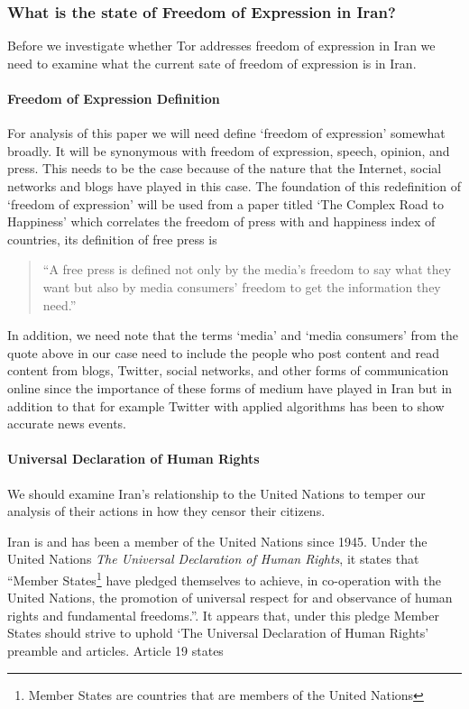 \documentclass[11pt]{article}
\begin{document}
\begin{multicols}{2}
\subsubsection{What is the state of Freedom of Expression in Iran?}
Before we investigate whether Tor addresses freedom of expression in Iran we need
to examine what the current sate of freedom of expression is in Iran. 

\paragraph{Freedom of Expression Definition}

For analysis of this paper we will need define `freedom of expression' somewhat
broadly. It will be synonymous with freedom of expression, speech, opinion, and
press.  This needs to be the case because of the nature that the Internet,
social networks and blogs have played in this case. The foundation of this
redefinition of `freedom of expression' will be used from a paper titled `The
Complex Road to Happiness' which correlates the freedom of press with and
happiness index of countries, its definition of free press is 
\begin{quotation} 
  ``A free press is defined not only by the media's freedom to say what they want
  but also by media consumers' freedom to get the information they need.''\cite{
  PublicAttitudeTowardFreedomPress, ComplexRoadToHappiness}
\end{quotation}
In addition, we need note that the terms `media' and `media consumers' from the
quote above in our case need to include the people who post content and read
content from blogs, Twitter, social networks, and other forms of communication
online since the importance of these forms of medium have played in Iran but in
addition to that for example Twitter with applied algorithms has been to show
accurate news events.  \cite{Twitter:BreakingNewsDetection,
Twitter:IdentificationLiveEvents, Twitter:MeasuringInfluence}

\paragraph{Universal Declaration of Human Rights}

We should examine Iran's relationship to the United Nations to temper our
analysis of their actions in how they censor their citizens. 

Iran is and has been a member of the United Nations since 1945.
\cite{UN:IranBecameMember, UN:IranActiveMember} Under the United Nations
\textit{The
Universal Declaration of Human Rights}, it states that ``Member States\footnote{Member 
States are countries that are members of the United Nations}
have pledged themselves to achieve, in co-operation with the United Nations, the
promotion of universal respect for and observance of human rights and
fundamental freedoms.''\cite{UniversalDeclerationOfHumanRights}. It appears
that, under this pledge Member States should strive to uphold `The Universal
Declaration of Human Rights' preamble and articles. Article 19 states


\end{multicols}
\end{document}
